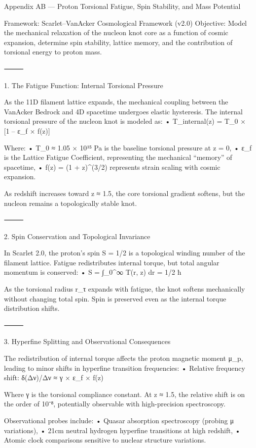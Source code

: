 Appendix AB — Proton Torsional Fatigue, Spin Stability, and Mass Potential

Framework: Scarlet–VanAcker Cosmological Framework (v2.0)
Objective: Model the mechanical relaxation of the nucleon knot core as a function of cosmic expansion, determine spin stability, lattice memory, and the contribution of torsional energy to proton mass.

⸻

1. The Fatigue Function: Internal Torsional Pressure

As the 11D filament lattice expands, the mechanical coupling between the VanAcker Bedrock and 4D spacetime undergoes elastic hysteresis. The internal torsional pressure of the nucleon knot is modeled as:
	•	T_internal(z) = T_0 × [1 – ε_f × f(z)]

Where:
	•	T_0 ≈ 1.05 × 10³⁵ Pa is the baseline torsional pressure at z = 0,
	•	ε_f is the Lattice Fatigue Coefficient, representing the mechanical “memory” of spacetime,
	•	f(z) = (1 + z)^(3/2) represents strain scaling with cosmic expansion.

As redshift increases toward z ≈ 1.5, the core torsional gradient softens, but the nucleon remains a topologically stable knot.

⸻

2. Spin Conservation and Topological Invariance

In Scarlet 2.0, the proton’s spin S = 1/2 is a topological winding number of the filament lattice. Fatigue redistributes internal torque, but total angular momentum is conserved:
	•	S = ∫_0^∞ T(r, z) dr = 1/2 ħ

As the torsional radius r_τ expands with fatigue, the knot softens mechanically without changing total spin. Spin is preserved even as the internal torque distribution shifts.

⸻

3. Hyperfine Splitting and Observational Consequences

The redistribution of internal torque affects the proton magnetic moment μ_p, leading to minor shifts in hyperfine transition frequencies:
	•	Relative frequency shift: δ(Δν)/Δν ≈ γ × ε_f × f(z)

Where γ is the torsional compliance constant. At z ≈ 1.5, the relative shift is on the order of 10⁻⁸, potentially observable with high-precision spectroscopy.

Observational probes include:
	•	Quasar absorption spectroscopy (probing μ variations),
	•	21cm neutral hydrogen hyperfine transitions at high redshift,
	•	Atomic clock comparisons sensitive to nuclear structure variations.

